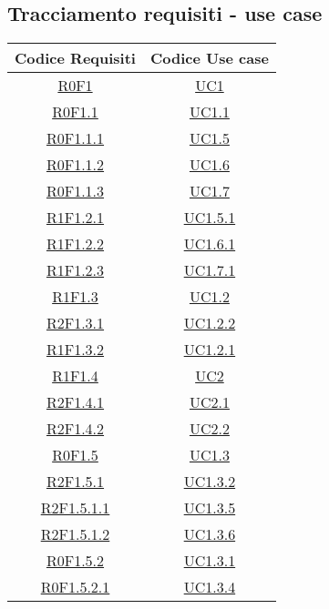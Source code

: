 \subsection{Tracciamento requisiti - use case}
\normalsize
\begin{longtable}{|c|c|}
	\hline
	\textbf{Codice Requisiti} & \textbf{Codice Use case} \\
	\hline
	\endhead
	\hyperlink{R0F1}{R0F1} & \hyperlink{UC1}{UC1}\\
	\hline
	\hyperlink{R0F1.1}{R0F1.1} & \hyperlink{UC1.1}{UC1.1}\\
	\hline
	\hyperlink{R0F1.1.1}{R0F1.1.1} & \hyperlink{UC1.5}{UC1.5}\\
	\hline
	\hyperlink{R0F1.1.2}{R0F1.1.2} & \hyperlink{UC1.6}{UC1.6}\\
	\hline
	\hyperlink{R0F1.1.3}{R0F1.1.3} & \hyperlink{UC1.7}{UC1.7}\\
	\hline
	\hyperlink{R1F1.2.1}{R1F1.2.1} & \hyperlink{UC1.5.1}{UC1.5.1}\\
	\hline
	\hyperlink{R1F1.2.2}{R1F1.2.2} & \hyperlink{UC1.6.1}{UC1.6.1}\\
	\hline
	\hyperlink{R1F1.2.3}{R1F1.2.3} & \hyperlink{UC1.7.1}{UC1.7.1}\\
	\hline
	\hyperlink{R1F1.3}{R1F1.3} & \hyperlink{UC1.2}{UC1.2}\\
	\hline
	\hyperlink{R2F1.3.1}{R2F1.3.1} & \hyperlink{UC1.2.2}{UC1.2.2}\\
	\hline
	\hyperlink{R1F1.3.2}{R1F1.3.2} & \hyperlink{UC1.2.1}{UC1.2.1}\\
	\hline
	\hyperlink{R1F1.4}{R1F1.4} & \hyperlink{UC2}{UC2}\\
	\hline
	\hyperlink{R2F1.4.1}{R2F1.4.1} & \hyperlink{UC2.1}{UC2.1}\\
	\hline
	\hyperlink{R2F1.4.2}{R2F1.4.2} & \hyperlink{UC2.2}{UC2.2}\\
	\hline
	\hyperlink{R0F1.5}{R0F1.5} & \hyperlink{UC1.3}{UC1.3}\\
	\hline
	\hyperlink{R2F1.5.1}{R2F1.5.1} & \hyperlink{UC1.3.2}{UC1.3.2}\\
	\hline
	\hyperlink{R2F1.5.1.1}{R2F1.5.1.1} & \hyperlink{UC1.3.5}{UC1.3.5}\\
	\hline
	\hyperlink{R2F1.5.1.2}{R2F1.5.1.2} & \hyperlink{UC1.3.6}{UC1.3.6}\\
	\hline
	\hyperlink{R0F1.5.2}{R0F1.5.2} & \hyperlink{UC1.3.1}{UC1.3.1}\\
	\hline
	\hyperlink{R0F1.5.2.1}{R0F1.5.2.1} & \hyperlink{UC1.3.4}{UC1.3.4}\\
	\hline

\end{longtable}
